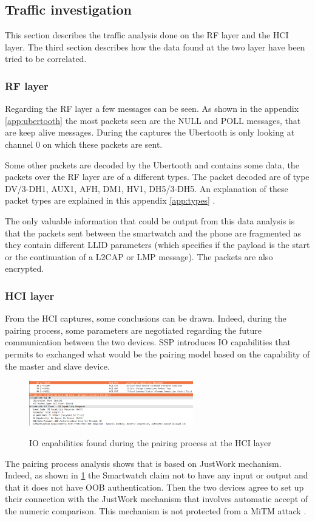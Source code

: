 \subsection{Traffic investigation}
This section describes the traffic analysis done on the RF layer and the HCI layer. The third section describes how the data found at the two layer have been tried to be correlated.
\subsubsection{RF layer}
Regarding the RF layer a few messages can be seen. As shown in the appendix \ref{app:ubertooth} the most packets seen are the NULL and POLL messages, that are keep alive messages. During the captures the Ubertooth is only looking at channel 0 on which these packets are sent.

Some other packets are decoded by the Ubertooth and contains some data, the packets over the RF layer are of a different types. The packet decoded are of type DV/3-DH1, AUX1, AFH, DM1, HV1, DH5/3-DH5. An explanation of these packet types are explained in this appendix \ref{app:types} .

The only valuable information that could be output from this data analysis is that the packets sent between the smartwatch and the phone are fragmented as they contain different LLID parameters (which specifies if the payload is the start or the continuation of a L2CAP or LMP message). The packets are also encrypted.

\subsubsection{HCI layer}
From the HCI captures, some conclusions can be drawn. Indeed, during the pairing process, some parameters are negotiated regarding the future communication between the two devices. SSP introduces IO capabilities that permits to exchanged what would be the pairing model based on the capability of the master and slave device. 
\begin{figure}[!h]
  \begin{center}
	\includegraphics[width=270px]{images/IO_PARAM.png}
	\label{fig:io}
	\caption{IO capabilities found during the pairing process at the HCI layer}
  \end{center}
\end{figure}
The pairing process analysis shows that is based on JustWork mechanism. Indeed, as shown in \ref{fig:io} the Smartwatch claim not to have any input or output and that it does not have OOB authentication. Then the two devices agree to set up their connection with the JustWork mechanism that involves automatic accept of the numeric comparison. This mechanism is not protected from a MiTM attack \cite{MiTMjustworks}.

